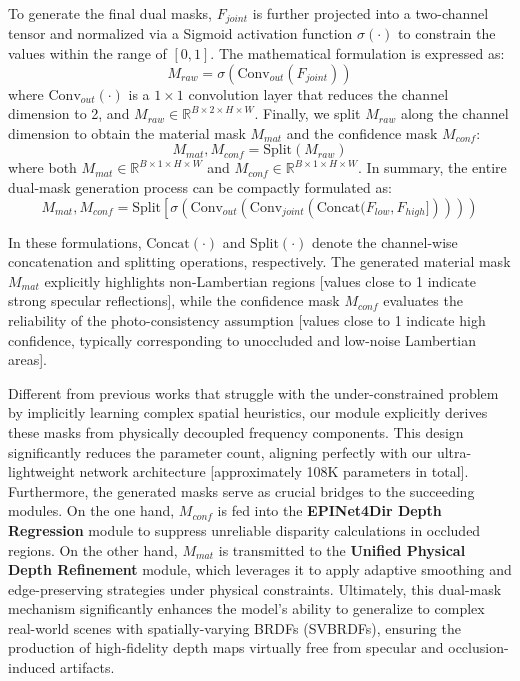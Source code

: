\documentclass[lettersize,journal]{IEEEtran}
\begin{document}
To generate the final dual masks, $F_{joint}$ is further projected into a two-channel tensor and normalized via a Sigmoid activation function $\sigma(\cdot)$ to constrain the values within the range of $[0, 1]$. The mathematical formulation is expressed as:
\begin{equation}
\label{eq:eq12}
M_{raw} = \sigma(\text{Conv}_{out}(F_{joint}))
\end{equation}
where $\text{Conv}_{out}(\cdot)$ is a $1 \times 1$ convolution layer that reduces the channel dimension to 2, and $M_{raw} \in \mathbb{R}^{B \times 2 \times H \times W}$. Finally, we split $M_{raw}$ along the channel dimension to obtain the material mask $M_{mat}$ and the confidence mask $M_{conf}$:
\begin{equation}
\label{eq:eq13}
M_{mat}, M_{conf} = \text{Split}(M_{raw})
\end{equation}
where both $M_{mat} \in \mathbb{R}^{B \times 1 \times H \times W}$ and $M_{conf} \in \mathbb{R}^{B \times 1 \times H \times W}$. In summary, the entire dual-mask generation process can be compactly formulated as:
\begin{equation}
\label{eq:eq14}
M_{mat}, M_{conf} = \text{Split}\left [\sigma\left(\text{Conv}_{out}\left(\text{Conv}_{joint}\left(\text{Concat}(F_{low}, F_{high}]\right)\right)\right)\right)
\end{equation}

In these formulations, $\text{Concat}(\cdot)$ and $\text{Split}(\cdot)$ denote the channel-wise concatenation and splitting operations, respectively. The generated material mask $M_{mat}$ explicitly highlights non-Lambertian regions  [values close to 1 indicate strong specular reflections], while the confidence mask $M_{conf}$ evaluates the reliability of the photo-consistency assumption  [values close to 1 indicate high confidence, typically corresponding to unoccluded and low-noise Lambertian areas]. 

Different from previous works that struggle with the under-constrained problem by implicitly learning complex spatial heuristics, our module explicitly derives these masks from physically decoupled frequency components. This design significantly reduces the parameter count, aligning perfectly with our ultra-lightweight network architecture  [approximately 108K parameters in total]. Furthermore, the generated masks serve as crucial bridges to the succeeding modules. On the one hand, $M_{conf}$ is fed into the \textbf{EPINet4Dir Depth Regression} module to suppress unreliable disparity calculations in occluded regions. On the other hand, $M_{mat}$ is transmitted to the \textbf{Unified Physical Depth Refinement} module, which leverages it to apply adaptive smoothing and edge-preserving strategies under physical constraints. Ultimately, this dual-mask mechanism significantly enhances the model's ability to generalize to complex real-world scenes with spatially-varying BRDFs (SVBRDFs), ensuring the production of high-fidelity depth maps virtually free from specular and occlusion-induced artifacts.
\end{document}
